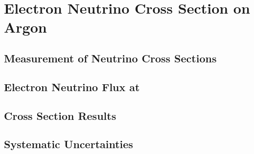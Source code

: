 \chapter{Electron Neutrino Cross Section on Argon}

\section{Measurement of Neutrino Cross Sections}

\section{Electron Neutrino Flux at \argoneut}

\section{Cross Section Results}

\section{Systematic Uncertainties} 